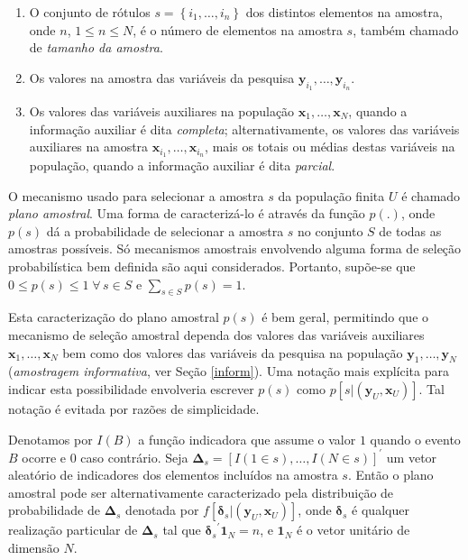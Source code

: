 \documentclass[
  12pt,
  brazilian,
]{book}
\theoremstyle{definition}
\theoremstyle{definition}
\theoremstyle{definition}
\theoremstyle{definition}
\theoremstyle{remark}
\begin{document}
\begin{enumerate}
\def\labelenumi{\arabic{enumi}.}
\item
  O conjunto de rótulos \(s=\left\{ i_1 , \ldots, i_n \right\}\) dos distintos
  elementos na amostra, onde \(n\), \(1 \leq n \leq N\), é o número
  de elementos na amostra \(s\), também chamado de \emph{tamanho da amostra}.
\item
  Os valores na amostra das variáveis da pesquisa
  \(\mathbf{y}_{i_1}, \ldots, \mathbf{y}_{i_n}\).
\item
  Os valores das variáveis auxiliares na população
  \(\mathbf{x}_1, \ldots, \mathbf{x}_N\), quando a informação auxiliar é dita
  \emph{completa}; alternativamente, os valores das variáveis auxiliares na amostra
  \(\mathbf{x}_{i_1}, \ldots, \mathbf{x}_{i_n}\), mais os totais ou médias
  destas variáveis na população, quando a informação auxiliar é dita
  \emph{parcial}.
\end{enumerate}

O mecanismo usado para selecionar a amostra \(s\) da população finita \(U\) é
chamado \emph{plano amostral}. Uma forma de caracterizá-lo é através da função
\(p\left( .\right)\), onde \(p(s)\) dá a probabilidade de selecionar a amostra \(s\)
no conjunto \(S\) de todas as amostras possíveis. Só mecanismos amostrais
envolvendo alguma forma de seleção probabilística bem definida são aqui
considerados. Portanto, supõe-se que \(0 \leq p(s) \leq 1 \; \forall \,s \in S\) e
\(\sum_{s \in S} p(s) = 1\).

Esta caracterização do plano amostral \(p(s)\) é bem geral, permitindo que o
mecanismo de seleção amostral dependa dos valores das variáveis auxiliares
\(\mathbf{x}_1, \ldots, \mathbf{x}_N\) bem como dos valores das variáveis da
pesquisa na população \(\mathbf{y}_1, \ldots, \mathbf{y}_N\) (\emph{amostragem informativa}, ver Seção \ref{inform}). Uma notação mais explícita para indicar
esta possibilidade envolveria escrever \(p(s)\) como \(p\left[ s | (\mathbf{y}_U , \mathbf{x}_U ) \right]\). Tal notação é evitada por razões de simplicidade.

Denotamos por \(I(B)\) a função indicadora que assume o valor \(1\) quando o evento
\(B\) ocorre e \(0\) caso contrário. Seja \(\mathbf{\Delta}_s = \left[ I(1 \in s), \ldots, I(N \in s) \right]^{\prime}\) um vetor aleatório de indicadores dos elementos incluídos na amostra \(s\). Então o plano amostral pode ser alternativamente caracterizado pela distribuição de probabilidade de \(\mathbf{\Delta }_s\) denotada por \(f\left[ \mathbf{\delta }_s | \left(\mathbf{y}_U, \mathbf{x}_U \right) \right]\), onde \(\mathbf{\delta }_s\) é qualquer realização particular de \(\mathbf{\Delta }_s\) tal que \({\mathbf{\delta}_s}^{\prime} \mathbf{1}_N = n\), e \(\mathbf{1}_N\) é o vetor unitário de dimensão \(N\).
\end{document}
